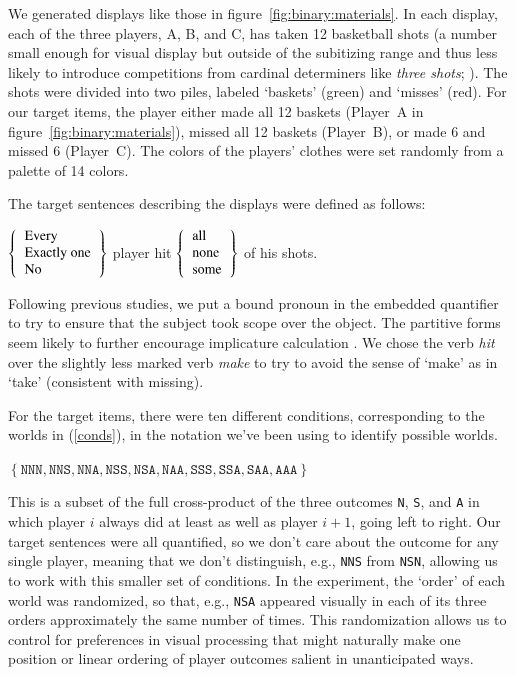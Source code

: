 \documentclass[leqno,12pt]{article}
\newcommand{\figref}[1]{figure~\ref{#1}}
\newcommand{\eg}[1]{(\ref{#1})}
\newcommand{\word}[1]{\emph{#1}}
\newcommand{\set}[1]{\ensuremath{\left\{ #1 \right\}}}
\newcommand{\world}[1]{\texttt{#1}}
\begin{document}
{We generated displays like those in \figref{fig:binary:materials}. In
each display, each of the three players, A, B, and C, has taken 12
basketball shots (a number small enough for visual display but outside
of the subitizing range and thus less likely to introduce competitions
from cardinal determiners like \word{three shots};
\citealt{Degen:Tanenhaus:2014}). The shots were divided into two
piles, labeled `baskets' (green) and `misses' (red).  For our target
items, the player either made all 12 baskets (Player~A in
\figref{fig:binary:materials}), missed all 12 baskets (Player~B), or
made 6 and missed 6 (Player~C). The colors of the players' clothes
were set randomly from a palette of 14 colors.

The target sentences describing the displays were defined as follows:
%
\begin{examples}
\item\label{expmsgs} 
  $\set{
      \begin{tabular}[c]{l}
        Every \\
        Exactly one \\
        No 
      \end{tabular}}$
    player hit 
    $\set{
      \begin{tabular}[c]{l}
        all \\
        none \\
        some 
      \end{tabular}}$
    of his shots.  
\end{examples}
%
Following previous studies, we put a bound pronoun in the embedded
quantifier to try to ensure that the subject took scope over the
object. The partitive forms seem likely to further encourage
implicature calculation
\citep{reed:1991-interpreting,Grodner-etal:2010,Degen:2015}. We chose
the verb \word{hit} over the slightly less marked verb \word{make} to
try to avoid the sense of `make' as in `take' (consistent with
missing).

For the target items, there were ten different conditions,
corresponding to the worlds in \eg{conds}, in the notation we've been
using to identify possible worlds.
%
\begin{examples}
\item\label{conds} $\set{\world{NNN}, \world{NNS}, \world{NNA},
    \world{NSS}, \world{NSA}, \world{NAA}, \world{SSS}, \world{SSA},
    \world{SAA}, \world{AAA}}$
\end{examples}
%
This is a subset of the full cross-product of the three outcomes
\world{N}, \world{S}, and \world{A} in which player $i$ always did at
least as well as player $i+1$, going left to right.  Our target
sentences were all quantified, so we don't care about the outcome for
any single player, meaning that we don't distinguish, e.g.,
\world{NNS} from \world{NSN}, allowing us to work with this smaller
set of conditions. In the experiment, the `order' of each world was
randomized, so that, e.g., \world{NSA} appeared visually in each of
its three orders approximately the same number of times. This
randomization allows us to control for preferences in visual
processing that might naturally make one position or linear ordering
of player outcomes salient in unanticipated ways.

}
\end{document}
